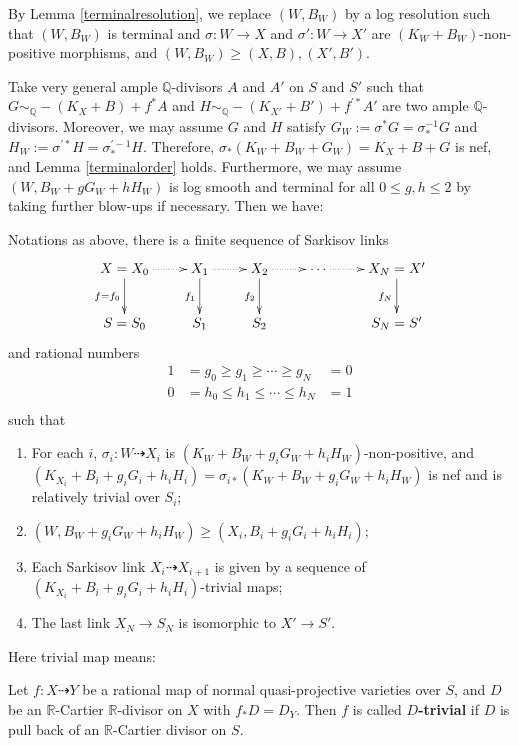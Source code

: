 By Lemma \ref{terminalresolution}, we  replace $(W,B_W)$ by a log resolution such that $(W,B_{W})$ is terminal and $\sigma:W\to X$ and $\sigma':W\to X'$ are $(K_W+B_W)$-non-positive morphisms, and $(W,B_W)\geqslant (X,B),(X',B')$.

Take  very general ample $\mathbb{Q}$-divisors $ A $ and $ A' $ on $ S $ and $ S' $ such that $ G\sim_{\mathbb{Q}}-(K_X+B)+f^*A $ and $ H\sim_{\mathbb{Q}}-(K_{X'}+B')+f^{'*}A' $ are two ample $\mathbb{Q}$-divisors. Moreover, we may assume $ G $ and $ H $ satisfy $G_{W}:= \sigma^*G=\sigma^{-1}_*G $ and $ H_{W}:=\sigma^{'*}H=\sigma^{'-1}_*H $. Therefore, $\sigma_{*}(K_{W}+B_{W}+G_{W})=K_{X}+B+G$ is nef, and Lemma \ref{terminalorder} holds.
Furthermore, we may assume $(W, B_W+gG_W+hH_W)$ is log smooth and terminal for all $0\leqslant g,h\leqslant 2$ by taking further blow-ups if necessary.
Then we have:
\begin{theorem}\label{main2}
  \cite[Claim 13.12]{haconMinimalModelProgram2012}
  Notations as above, there is a finite sequence of Sarkisov links
  \[
    \xymatrix{
    X=X_0\ar@{.>}[r]\ar[d]_{f=f_{0}}&X_{1}\ar@{.>}[r]\ar[d]_{f_{1}}& X_{2}\ar[d]_{f_{2}}\ar@{.>}[r] &\cdots\ar@{.>}[r]&X_N=X'\ar[d]_{f_{N}} \\
    S=S_{0}&S_{1} &S_{2}&&S_N=S'
    }
  \]
  and rational numbers
  \[
    \begin{aligned}
      1 & =g_0\geqslant g_1 \geqslant \cdots \geqslant g_N   & =0 \\
      0 & =h_0\leqslant h_{1} \leqslant \cdots \leqslant h_N & =1 \\
    \end{aligned}
  \]
  such that
  \begin{enumerate}
    \item For each $i$, $\sigma_i:W\dashrightarrow  X_{i}$ is $(K_{W}+B_{W}+g_{i}G_{W}+h_{i}H_{W})$-non-positive, and $(K_{X_{i}}+B_{i}+g_{i}G_{i}+h_{i}H_{i})=\sigma_{i*}(K_{W}+B_{W}+g_{i}G_{W}+h_{i}H_{W})$ is nef and is relatively trivial over $S_{i}$;
    \item $(W,B_{W}+g_{i}G_{W}+h_{i}H_{W})\geqslant (X_{i},B_{i}+g_{i}G_{i}+h_{i}H_{i})$;
    \item Each Sarkisov link $X_{i}\dashrightarrow X_{i+1}$ is given by a sequence of $(K_{X_{i}}+B_{i}+g_{i}G_{i}+h_{i}H_{i})$-trivial maps;
    \item  The last link $X_{N} \to S_{N}$ is isomorphic to $X'\to S'$.
  \end{enumerate}
\end{theorem}
Here trivial map means:
\begin{definition}\label{trivialmap}
  \cite[\S 13.2]{haconMinimalModelProgram2012} Let $f:X\dashrightarrow Y$ be a rational map of normal quasi-projective varieties over $S$, and $D$ be an $\mathbb{R}$-Cartier $\mathbb{R}$-divisor  on $X$ with $f_*D=D_Y$. Then $f$ is called \textbf{$D$-trivial} if $D$ is pull back of an $\mathbb{R}$-Cartier divisor on $S$.
\end{definition}

